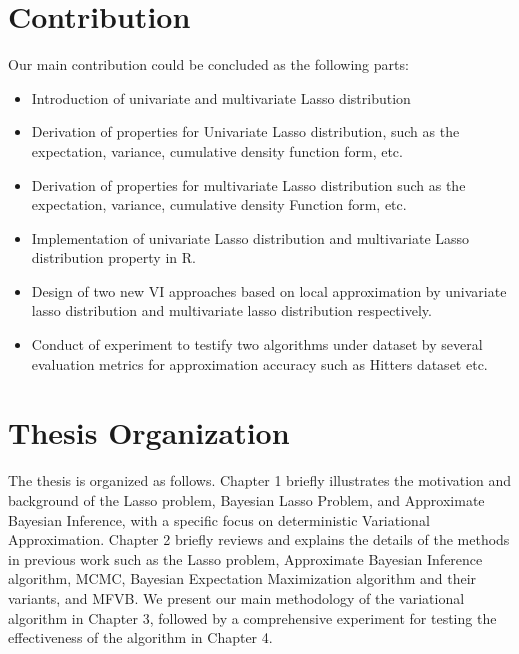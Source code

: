 \section{Contribution}
\label{cont}
Our main contribution could be concluded as the following parts:
\begin{itemize}
	\item Introduction of univariate and multivariate Lasso distribution
	\item Derivation of properties for Univariate Lasso distribution, such as the expectation, variance, cumulative density function form, etc.
	\item Derivation of properties for multivariate Lasso distribution such as the expectation, variance, cumulative density Function form, etc.
	\item Implementation of univariate Lasso distribution and multivariate Lasso distribution property in R.
	\item Design of two new VI approaches based on local approximation by univariate lasso distribution and multivariate lasso distribution respectively.
	\item Conduct of experiment to testify two algorithms under dataset by several evaluation metrics for approximation accuracy such as Hitters dataset etc.
\end{itemize}



\section{Thesis Organization}
The thesis is organized as follows. Chapter 1 briefly illustrates the motivation and background of the Lasso problem, Bayesian Lasso Problem, and Approximate Bayesian Inference, with a specific focus on deterministic Variational Approximation. Chapter 2  briefly reviews and explains the details of the methods in previous work such as the Lasso problem, Approximate Bayesian Inference algorithm, MCMC, Bayesian Expectation Maximization algorithm and their variants, and MFVB. We present our main methodology of the variational algorithm in Chapter 3, followed by a comprehensive experiment for testing the effectiveness of the algorithm in Chapter 4. 




